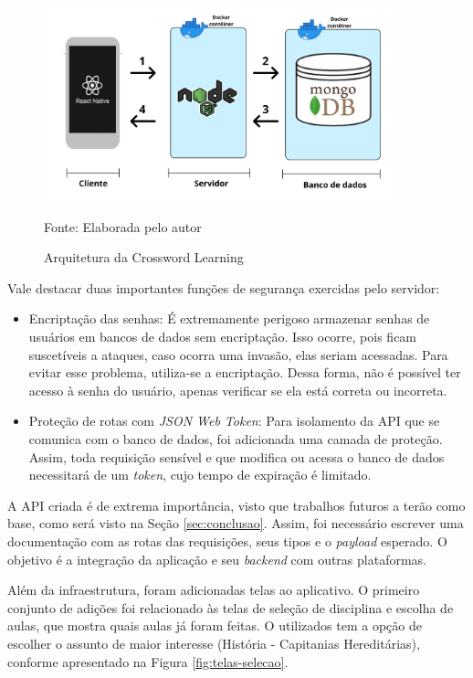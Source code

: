 \begin{figure}[H]
\centering
    \caption{Arquitetura da Crossword Learning}
    \label{fig:arquitetura}
    \includegraphics[width=0.9\textwidth]{Figuras/crossword-archictecture.png}
    
    Fonte: Elaborada pelo autor
\end{figure}

Vale destacar duas importantes funções de segurança exercidas pelo servidor:
\begin{itemize}
    \item Encriptação das senhas: É extremamente perigoso armazenar senhas de usuários em bancos de dados sem encriptação. Isso ocorre, pois ficam suscetíveis a ataques, caso ocorra uma invasão, elas seriam acessadas. Para evitar esse problema, utiliza-se a encriptação. Dessa forma, não é possível ter acesso à senha do usuário, apenas verificar se ela está correta ou incorreta.
    
    \item Proteção de rotas com \textit{JSON Web Token}: Para isolamento da API que se comunica com o banco de dados, foi adicionada uma camada de proteção. Assim, toda requisição sensível e que modifica ou acessa o banco de dados necessitará de um \textit{token}, cujo tempo de expiração é limitado.
\end{itemize}

A API criada é de extrema importância, visto que trabalhos futuros a terão como base, como será visto na Seção \ref{sec:conclusao}. Assim, foi necessário escrever uma documentação com as rotas das requisições, seus tipos e o \textit{payload} esperado. O objetivo é a integração da aplicação e seu \textit{backend} com outras plataformas.

Além da infraestrutura, foram adicionadas telas ao aplicativo. O primeiro conjunto de adições foi relacionado às telas de seleção de disciplina e escolha de aulas, que mostra quais aulas já foram feitas. O utilizados tem a opção de escolher o assunto de maior interesse (História - Capitanias Hereditárias), conforme apresentado na Figura \ref{fig:telas-selecao}.


